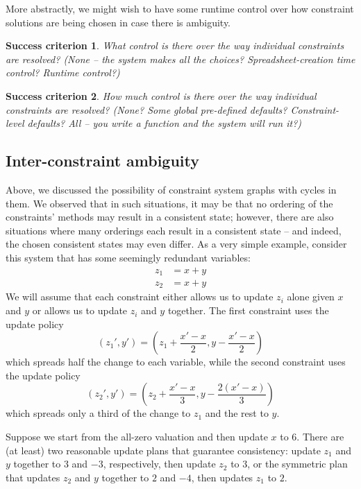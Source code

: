 \documentclass{article}
\newtheorem{success}{Success criterion}
\begin{document}
More abstractly, we might wish to have some runtime control over how
constraint solutions are being chosen in case there is ambiguity.

\begin{success}
    What control is there over the way individual constraints are resolved?
    (None -- the system makes all the choices? Spreadsheet-creation time
    control? Runtime control?)
\end{success}

\begin{success}
    How much control is there over the way individual constraints are
    resolved? (None? Some global pre-defined defaults? Constraint-level
    defaults? All -- you write a function and the system will run it?)
\end{success}

\subsection{Inter-constraint ambiguity}
Above, we discussed the possibility of constraint system graphs with cycles
in them. We observed that in such situations, it may be that no ordering of
the constraints' methods may result in a consistent state; however, there
are also situations where many orderings each result in a consistent state
-- and indeed, the chosen consistent states may even differ. As a very
simple example, consider this system that has some seemingly redundant
variables:
\begin{align*}
    z_1 &= x+y \\
    z_2 &= x+y
\end{align*}
We will assume that each constraint either allows us to update $z_i$ alone
given $x$ and $y$ or allows us to update $z_i$ and $y$ together. The first
constraint uses the update policy
\[(z_1',y') = \left(z_1 + \frac{x'-x}2, y - \frac{x'-x}2\right)\]
which spreads half the change to each variable, while the second constraint
uses the update policy
\[(z_2',y') = \left(z_2 + \frac{x'-x}3, y - \frac{2(x'-x)}3\right)\]
which spreads only a third of the change to $z_1$ and the rest to $y$.

Suppose we start from the all-zero valuation and then update $x$ to $6$.
There are (at least) two reasonable update plans that guarantee consistency:
update $z_1$ and $y$ together to $3$ and $-3$, respectively, then update
$z_2$ to $3$, or the symmetric plan that updates $z_2$ and $y$ together to
$2$ and $-4$, then updates $z_1$ to $2$.
\end{document}
